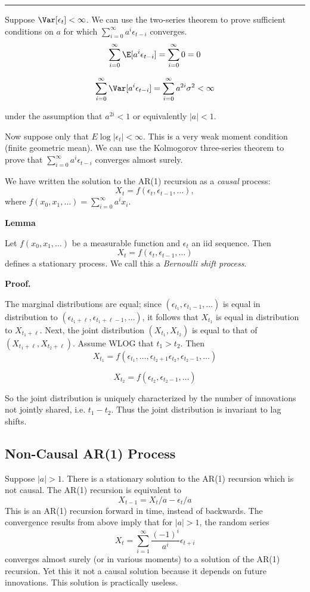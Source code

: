 \begin{center}\rule{0.5\linewidth}{0.5pt}\end{center}

Suppose \(\Var[\epsilon_t] < \infty\). We can use the two-series theorem to prove sufficient conditions on \(a\) for which \(\sum_{i=0}^\infty a^i \epsilon_{t-i}\) converges.
\[\sum_{i=0}^\infty \E[a^i \epsilon_{t-i}] = \sum_{i=0}^\infty 0 = 0\]

\[\sum_{i=0}^\infty \Var[a^i \epsilon_{t-i}] = \sum_{i=0}^\infty a^{2i}\sigma^2 < \infty\]

under the assumption that \(a^{2i} < 1\) or equivalently \(|a| < 1\).

Now suppose only that \(E \log |\epsilon_t| < \infty\). This is a very weak moment condition (finite geometric mean). We can use the Kolmogorov three-series theorem to prove that \(\sum_{i=0}^\infty a^i \epsilon_{t-i}\) converges almost surely.

We have written the solution to the AR(1) recursion as a \emph{causal} process:
\[X_t = f(\epsilon_t, \epsilon_{t-1}, \dots),\]
where \(f(x_0, x_1, \dots) = \sum_{i=0}^\infty a^i x_i\).

\textbf{Lemma}

Let \(f(x_0, x_1, \dots)\) be a measurable function and \(\epsilon_t\) an iid sequence. Then
\[X_t = f(\epsilon_t, \epsilon_{t-1}, \dots)\]
defines a stationary process. We call this a \emph{Bernoulli shift process}.

\textbf{Proof.}

The marginal distributions are equal; since \((\epsilon_{t_1}, \epsilon_{t_1 - 1}, \dots)\) is equal in distribution to \((\epsilon_{t_1 + \ell}, \epsilon_{t_1 + \ell - 1}, \dots)\), it follows that \(X_{t_1}\) is equal in distribution to \(X_{t_1 + \ell}\). Next, the joint distribution \((X_{t_1}, X_{t_2})\) is equal to that of \((X_{t_1 + \ell}, X_{t_2 + \ell})\). Assume WLOG that \(t_1 > t_2\). Then
\[X_{t_1} = f(\epsilon_{t_1}, \dots, \epsilon_{t_2 + 1} \epsilon_{t_2}, \epsilon_{t_2 - 1}, \dots)\]

\[X_{t_2} = f(\epsilon_{t_2}, \epsilon_{t_2 - 1}, \dots)\]

So the joint distribution is uniquely characterized by the number of innovations not jointly shared, i.e. \(t_1 - t_2\). Thus the joint distribution is invariant to lag shifts.

\subsection*{Non-Causal AR(1) Process}
Suppose \(|a| > 1\). There is a stationary solution to the AR(1) recursion which is not causal. The AR(1) recursion is equivalent to
\[X_{t-1} = X_t /a - \epsilon_t / a\]
This is an AR(1) recursion forward in time, instead of backwards. The convergence results from above imply that for \(|a| > 1\), the random series
\[X_t = \sum_{i=1}^\infty \frac{(-1)^i}{a^i} \epsilon_{t+i}\]
converges almost surely (or in various moments) to a solution of the AR(1) recursion. Yet this it not a causal solution because it depends on future innovations. This solution is practically useless.

